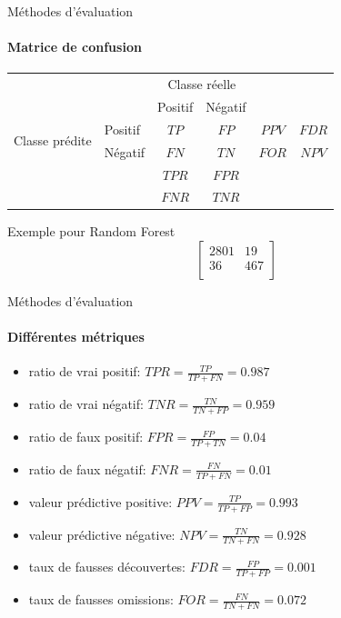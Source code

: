 \documentclass[usenames,dvipsnames]{beamer}
\begin{document}
\begin{frame}{Méthodes d'évaluation}
\framesubtitle{Matrice de confusion}

\begin{tabular}{ l | l | c | c | c c}
\multicolumn{2}{c}{} & \multicolumn{2}{c}{Classe réelle} & \\
\cline{3-4}
\multicolumn{2}{c|}{} & Positif & Négatif \\
\cline{2-4}
\multirow{2}{*}{Classe prédite} & Positif & $TP$ & $FP$ & $PPV$ & $FDR$ \\
\cline{2-4}
& Négatif & $FN$ & $TN$ & $FOR$ & $NPV$ \\
\cline{2-4}
\multicolumn{1}{r}{} & \multicolumn{1}{l}{} & \multicolumn{1}{c}{$TPR$} & \multicolumn{1}{c}{$FPR$} \\
\multicolumn{1}{l}{} & \multicolumn{1}{l}{} & \multicolumn{1}{c}{$FNR$} & \multicolumn{1}{c}{$TNR$} \\
\end{tabular}

\medskip

\begin{block}{Exemple pour Random Forest}
$$\begin{bmatrix}
2801 & 19 \\ 
36 & 467 \\
\end{bmatrix}$$
\end{block}

\end{frame}

\begin{frame}{Méthodes d'évaluation}
\framesubtitle{Différentes métriques}
\begin{itemize}
\item ratio de vrai positif: $TPR=\frac{TP}{TP+FN}=0.987$
\item ratio de vrai négatif: $TNR=\frac{TN}{TN+FP} = 0.959$
\item ratio de faux positif: $FPR=\frac{FP}{TP+TN}=0.04$
\item ratio de faux négatif: $FNR=\frac{FN}{TP+FN}=0.01 $
\item valeur prédictive positive: $PPV=\frac{TP}{TP+FP}=0.993$
\item valeur prédictive négative: $NPV=\frac{TN}{TN+FN}=0.928$
\item taux de fausses découvertes: $FDR=\frac{FP}{TP+FP}=0.001$
\item taux de fausses omissions: $FOR=\frac{FN}{TN+FN}=0.072$
\end{itemize}
\end{frame}
\end{document}
